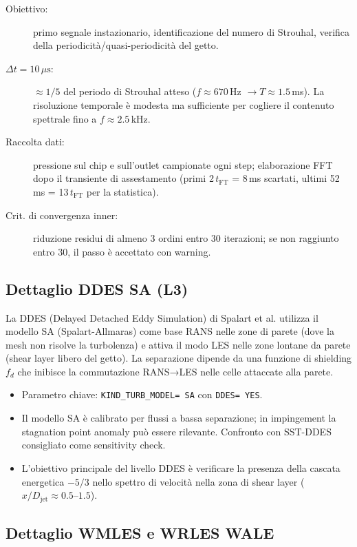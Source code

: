\documentclass[11pt,a4paper]{article}
\newcommand{\ttcfg}[1]{\texttt{\color{codegray}#1}}
\newcommand{\Djet}{D_{\mathrm{jet}}}
\newcommand{\mus}{\,\mu\mathrm{s}}
\newcommand{\tFT}{t_{\mathrm{FT}}}
\begin{document}
\begin{description}
  \item[Obiettivo:] primo segnale instazionario, identificazione del numero di Strouhal, verifica della periodicità/quasi-periodicità del getto.
  \item[$\Delta t = 10\mus$:] $\approx 1/5$ del periodo di Strouhal atteso ($f \approx 670$\,Hz $\rightarrow T \approx 1.5$\,ms). La risoluzione temporale è modesta ma sufficiente per cogliere il contenuto spettrale fino a $f \approx 2.5$\,kHz.
  \item[Raccolta dati:] pressione sul chip e sull'outlet campionate ogni step; elaborazione FFT dopo il transiente di assestamento (primi 2\,$\tFT$ = 8\,ms scartati, ultimi 52\,ms = 13\,$\tFT$ per la statistica).
  \item[Crit. di convergenza inner:] riduzione residui di almeno 3 ordini entro 30 iterazioni; se non raggiunto entro 30, il passo è accettato con warning.
\end{description}

\subsection{Dettaglio DDES SA (L3)}

La DDES (Delayed Detached Eddy Simulation) di Spalart et al. \cite{Spalart2006} utilizza il modello SA (Spalart-Allmaras) come base RANS nelle zone di parete (dove la mesh non risolve la turbolenza) e attiva il modo LES nelle zone lontane da parete (shear layer libero del getto). La separazione dipende da una funzione di shielding $f_d$ che inibisce la commutazione RANS→LES nelle celle attaccate alla parete.

\begin{itemize}
  \item Parametro chiave: \ttcfg{KIND\_TURB\_MODEL= SA} con \ttcfg{DDES= YES}.
  \item Il modello SA è calibrato per flussi a bassa separazione; in impingement la stagnation point anomaly può essere rilevante. Confronto con SST-DDES consigliato come sensitivity check.
  \item L'obiettivo principale del livello DDES è verificare la presenza della cascata energetica $-5/3$ nello spettro di velocità nella zona di shear layer ($x/\Djet \approx 0.5$--$1.5$).
\end{itemize}

\subsection{Dettaglio WMLES e WRLES WALE}
\end{document}

